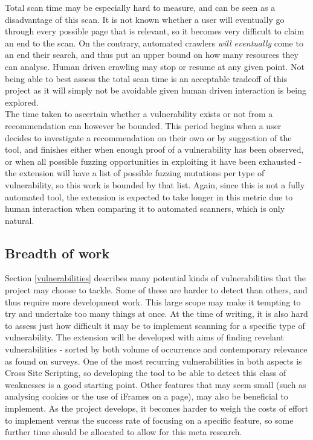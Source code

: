 Total scan time may be especially hard to measure, and can be seen as a disadvantage of this scan. It is not known whether a user will eventually go through every possible page that is relevant, so it becomes very difficult to claim an end to the scan. On the contrary, automated crawlers \emph{will eventually} come to an end their search, and thus put an upper bound on how many resources they can analyse. Human driven crawling may stop or resume at any given point. Not being able to best assess the total scan time is an acceptable tradeoff of this project as it will simply not be avoidable given human driven interaction is being explored. \\

The time taken to ascertain whether a vulnerability exists or not from a recommendation can however be bounded. This period begins when a user decides to investigate a recommendation on their own or by suggestion of the tool, and finishes either when enough proof of a vulnerability has been observed, or when all possible fuzzing opportunities in exploiting it have been exhausted - the extension will have a list of possible fuzzing mutations per type of vulnerability, so this work is bounded by that list. Again, since this is not a fully automated tool, the extension is expected to take longer in this metric due to human interaction when comparing it to automated scanners, which is only natural. \\

 \subsection{Breadth of  work}
 Section \ref{vulnerabilities} describes many potential kinds of vulnerabilities that the project may choose to tackle. Some of these are harder to detect than others, and thus require more development work. This large scope may make it tempting to try and undertake too many things at once. At the time of writing, it is also hard to assess just how difficult it may be to implement scanning for a specific type of vulnerability. The extension will be developed with aims of finding revelant vulnerabilities - sorted by both volume of occurrence and contemporary relevance as found on surveys. One of the most recurring vulnerabilities in both aspects is Cross Site Scripting, so developing the tool to be able to detect this class of weaknesses is a good starting point. Other features that may seem small (such as analysing cookies or the use of iFrames on a page), may also be beneficial to implement. As the project develops, it becomes harder to weigh the costs of effort to implement versus the success rate of focusing on a specific feature, so some further time should be allocated to allow for this meta research. \\ 
 
